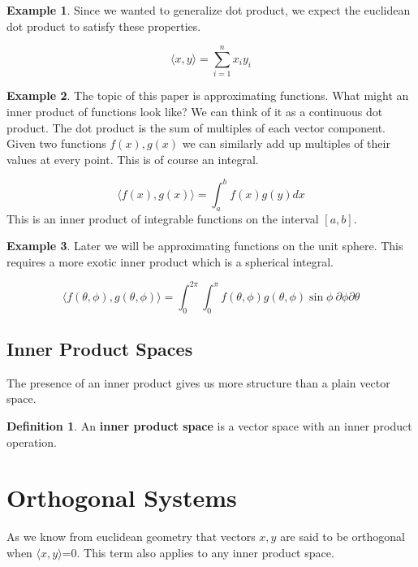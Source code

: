 \documentclass{article}
\theoremstyle{definition}
\newtheorem{definition}{Definition}
\theoremstyle{definition}
\newtheorem{example}{Example}
\begin{document}
\begin{example}
    Since we wanted to generalize dot product, we expect the euclidean dot product to satisfy these properties.

    $$\langle x, y \rangle =\sum_{i=1}^{n} x_{i}y_{i}$$
\end{example}

\begin{example} 
    The topic of this paper is approximating functions. What might an inner product of functions look like? We can think of it as a continuous dot product. The dot product is the sum of multiples of each vector component. Given two functions $f(x), g(x)$ we can similarly add up multiples of their values at every point. This is of course an integral.

    $$\langle f(x), g(x) \rangle = \int_{a}^{b} f(x)g(y) dx$$
    This is an inner product of integrable functions on the interval $[a, b]$.
\end{example}

\begin{example}
    Later we will be approximating functions on the unit sphere. This requires a more exotic inner product which is a spherical integral.

    $$\langle f(\theta, \phi), g(\theta, \phi) \rangle=\int_{0}^{2\pi}\int_{0}^{\pi}f(\theta, \phi)g(\theta, \phi)\sin\phi\ \partial\phi \partial\theta$$

\end{example}


\subsection{Inner Product Spaces}

The presence of an inner product gives us more structure than a plain vector space. 

\begin{definition}
    An \textbf{inner product space} is a vector space with an inner product operation.
\end{definition}


\section{Orthogonal Systems}

As we know from euclidean geometry that vectors $x, y$ are said to be orthogonal when $\langle x, y \rangle$=0. This term also applies to any inner product space.
\end{document}
